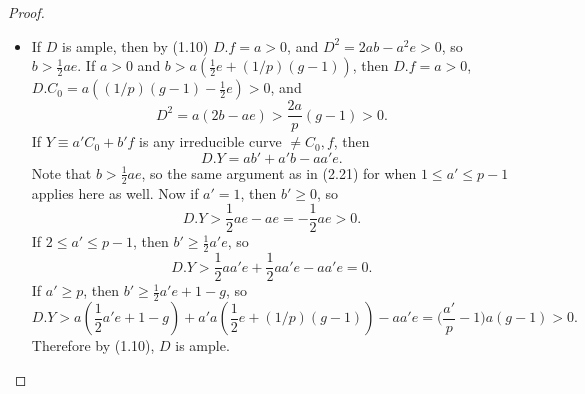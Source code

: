 \documentclass[a4paper]{article}
\begin{document}
\begin{enumerate} [label=\textbf{\arabic*.}, leftmargin=0em]
\begin{proof}
\begin{itemize} [leftmargin=0cm]
                  \item[(b)] If $D$ is ample, then by (1.10) $D.f = a > 0$, and $D^2 = 2ab - a^2 e > 0$, so $b > \frac{1}{2}ae$.
                        If $a > 0$ and $b > a(\frac{1}{2}e + (1/p)(g - 1))$, then $D.f = a > 0$, $D.C_0 = a((1/p)(g - 1) - \frac{1}{2}e) > 0$, and
                        \begin{equation*}
                            D^2 = a(2b - ae) > \frac{2a}{p}(g - 1) > 0.
                        \end{equation*}
                        If $Y \equiv a'C_0 + b'f$ is any irreducible curve $\neq C_0, f$, then
                        \begin{equation*}
                            D.Y = ab' + a'b - aa'e.
                        \end{equation*}
                        Note that $b > \frac{1}{2}ae$, so the same argument as in (2.21) for when $1 \leq a' \leq p - 1$ applies here as well.
                        Now if $a' = 1$, then $b' \geq 0$, so $$D.Y > \frac{1}{2}ae - ae = -\frac{1}{2}ae > 0.$$
                        If $2 \leq a' \leq p - 1$, then $b' \geq \frac{1}{2}a'e$, so $$D.Y > \frac{1}{2}aa'e + \frac{1}{2}aa'e - aa'e = 0.$$
                        If $a' \geq p$, then $b' \geq \frac{1}{2}a'e + 1 - g$, so
                        \begin{equation*}
                            D.Y > a (\frac{1}{2}a'e + 1 - g) + a'a(\frac{1}{2}e + (1/p)(g - 1)) - aa'e = \bigg( \frac{a'}{p} - 1 \bigg)a(g - 1) > 0.
                        \end{equation*}
                        Therefore by (1.10), $D$ is ample.
              \end{itemize}
          \end{proof}


\end{enumerate}
\end{document}
